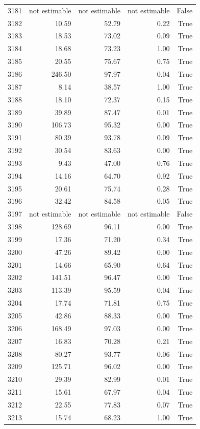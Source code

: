 \begin{longtable}{rrrrr}
3181 & not estimable & not estimable & not estimable & False \\
3182 & 10.59 & 52.79 & 0.22 & True \\
3183 & 18.53 & 73.02 & 0.09 & True \\
3184 & 18.68 & 73.23 & 1.00 & True \\
3185 & 20.55 & 75.67 & 0.75 & True \\
3186 & 246.50 & 97.97 & 0.04 & True \\
3187 & 8.14 & 38.57 & 1.00 & True \\
3188 & 18.10 & 72.37 & 0.15 & True \\
3189 & 39.89 & 87.47 & 0.01 & True \\
3190 & 106.73 & 95.32 & 0.00 & True \\
3191 & 80.39 & 93.78 & 0.09 & True \\
3192 & 30.54 & 83.63 & 0.00 & True \\
3193 & 9.43 & 47.00 & 0.76 & True \\
3194 & 14.16 & 64.70 & 0.92 & True \\
3195 & 20.61 & 75.74 & 0.28 & True \\
3196 & 32.42 & 84.58 & 0.05 & True \\
3197 & not estimable & not estimable & not estimable & False \\
3198 & 128.69 & 96.11 & 0.00 & True \\
3199 & 17.36 & 71.20 & 0.34 & True \\
3200 & 47.26 & 89.42 & 0.00 & True \\
3201 & 14.66 & 65.90 & 0.64 & True \\
3202 & 141.51 & 96.47 & 0.00 & True \\
3203 & 113.39 & 95.59 & 0.04 & True \\
3204 & 17.74 & 71.81 & 0.75 & True \\
3205 & 42.86 & 88.33 & 0.00 & True \\
3206 & 168.49 & 97.03 & 0.00 & True \\
3207 & 16.83 & 70.28 & 0.21 & True \\
3208 & 80.27 & 93.77 & 0.06 & True \\
3209 & 125.71 & 96.02 & 0.00 & True \\
3210 & 29.39 & 82.99 & 0.01 & True \\
3211 & 15.61 & 67.97 & 0.04 & True \\
3212 & 22.55 & 77.83 & 0.07 & True \\
3213 & 15.74 & 68.23 & 1.00 & True \\

\end{longtable}
